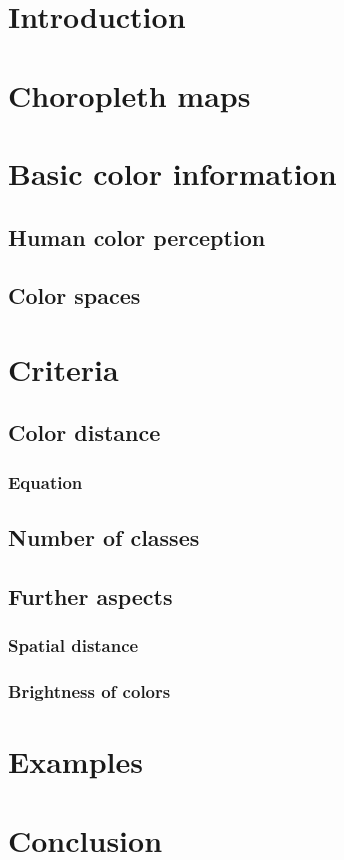 \section{Introduction}

\section{Choropleth maps}

\section{Basic color information}

\subsection{Human color perception}

\subsection{Color spaces}

\section{Criteria}

\subsection{Color distance}

\subsubsection{Equation}

\subsection{Number of classes}

\subsection{Further aspects}

\subsubsection{Spatial distance}

\subsubsection{Brightness of colors}

\section{Examples}

\section{Conclusion}


